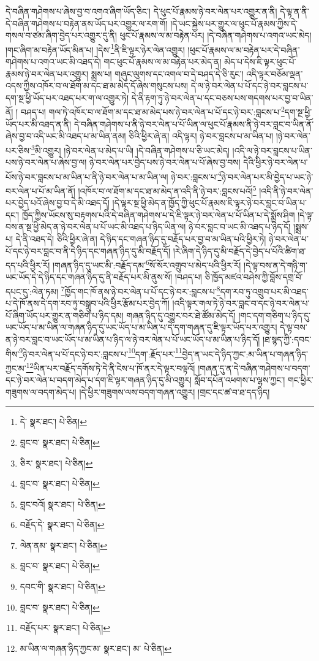 དེ་བཞིན་གཤེགས་པ་ཞེས་བྱ་བ་འགའ་ཞིག་ཡོད་ཅིང་། དེ་ཕུང་པོ་རྣམས་ཉེ་བར་ལེན་པར་འགྱུར་ན་ནི། དེ་ལྟ་ན་ནི་དེ་བཞིན་གཤེགས་པ་བརྟེན་ནས་ཡོད་པར་འགྱུར་ལ་རག་གོ། །དེ་ཡང་སྐྱེས་པར་གྱུར་ལ་ཕུང་པོ་རྣམས་ཀྱིས་དེ་གསལ་བ་ཙམ་ཞིག་བྱེད་པར་འགྱུར་དུ་ནི། ཕུང་པོ་རྣམས་ལ་མ་བརྟེན་པར། །དེ་བཞིན་གཤེགས་པ་འགའ་ཡང་མེད། །གང་ཞིག་མ་བརྟེན་ཡོད་མིན་པ། །དེས་\footnote{དེ་  སྣར་ཐང་།  པེ་ཅིན། }ནི་ཇི་ལྟར་ཉེར་ལེན་འགྱུར། །ཕུང་པོ་རྣམས་ལ་མ་བརྟེན་པར་དེ་བཞིན་གཤེགས་པ་འགའ་ཡང་མི་འཐད་དེ། གང་ཕུང་པོ་རྣམས་ལ་མ་བརྟེན་པར་མེད་ན། མེད་པ་དེས་ཇི་ལྟར་ཕུང་པོ་རྣམས་ཉེ་བར་ལེན་པར་འགྱུར། སྨྲས་པ། གཞུང་ལུགས་དང་འགལ་བ་དེ་བཤད་དེ་ཅི་རུང་། འདི་ལྟར་བཅོམ་ལྡན་འདས་ཀྱིས་འཁོར་བ་ལ་ཐོག་མ་དང་ཐ་མ་མེད་དོ་ཞེས་གསུངས་པས། དེ་ལ་ཉེ་བར་ལེན་པ་པོ་དང་ཉེ་བར་བླངས་པ་དག་སྔ་ཕྱི་ཡོད་པར་འཐད་པར་ག་ལ་འགྱུར་ཏེ། དེ་ནི་རྟག་ཏུ་ཉེ་བར་ལེན་པ་དང་བཅས་པས་གདགས་པར་བྱ་བ་ཡིན་ནོ། །
བཤད་པ། གལ་ཏེ་འཁོར་བ་ལ་ཐོག་མ་དང་ཐ་མ་མེད་པས་ཉེ་བར་ལེན་པ་པོ་དང་ཉེ་བར་:བླངས་པ་\footnote{བླང་བ་  སྣར་ཐང་།  པེ་ཅིན། }དག་སྔ་ཕྱི་ཡོད་པར་མི་འཐད་ན་ནི། དེ་བཞིན་གཤེགས་པ་ནི་ཉེ་བར་ལེན་པ་པོ་ཡིན་ལ་ཕུང་པོ་རྣམས་ནི་ཉེ་བར་བླང་བ་ཡིན་ནོ་ཞེས་བྱ་བ་འདི་ཡང་མི་འཐད་པ་མ་ཡིན་ནམ། ཅིའི་ཕྱིར་ཞེ་ན། འདི་ལྟར། ཉེ་བར་བླངས་པ་མ་ཡིན་པ། །ཉེ་བར་ལེན་པར་ཅིས་\footnote{ཅིར་  སྣར་ཐང་།  པེ་ཅིན། }མི་འགྱུར། །ཉེ་བར་ལེན་པ་མེད་པ་ཡི། །དེ་བཞིན་གཤེགས་པ་ཅི་ཡང་མེད། །འདི་ལ་ཉེ་བར་བླངས་པ་ཡིན་པས་ཉེ་བར་ལེན་པ་ཞེས་བྱ་ལ། ཉེ་བར་ལེན་པར་བྱེད་པས་ཉེ་བར་ལེན་པ་པོ་ཞེས་བྱ་བས། དེའི་ཕྱིར་ཉེ་བར་ལེན་པ་པོས་ཉེ་བར་བླངས་པ་མ་ཡིན་པ་ནི་ཉེ་བར་ལེན་པ་མ་ཡིན་ལ། ཉེ་བར་:བླངས་པ་\footnote{བླང་བ་  སྣར་ཐང་།  པེ་ཅིན། }ཉེ་བར་ལེན་པར་མི་བྱེད་པ་ཡང་ཉེ་བར་ལེན་པ་པོ་མ་ཡིན་ནོ། །འཁོར་བ་ལ་ཐོག་མ་དང་ཐ་མ་མེད་ན་འདི་ནི་ཉེ་བར་:བླངས་པའོ།\footnote{བླང་བའོ།  སྣར་ཐང་།  པེ་ཅིན། } །འདི་ནི་ཉེ་བར་ལེན་པར་བྱེད་པའོ་ཞེས་བྱ་བ་དེ་མི་འཐད་དོ། །དེ་ལྟར་སྔ་ཕྱི་མེད་ན་ཁྱོད་ཀྱི་ཕུང་པོ་རྣམས་ཇི་ལྟར་ཉེ་བར་བླང་བ་ཡིན་པ་དང་། ཁྱོད་ཀྱིས་ཡོངས་སུ་བརྟགས་པའི་དེ་བཞིན་གཤེགས་པ་དེ་ཇི་ལྟར་ཉེ་བར་ལེན་པ་པོ་ཡིན་པ་དེ་སྨྲོས་ཤིག །དེ་ལྟ་བས་ན་སྔ་ཕྱི་མེད་ན་ཉེ་བར་ལེན་པ་པོ་ཡང་མི་འཐད་པ་ཉིད་ཡིན་ལ། ཉེ་བར་བླང་བ་ཡང་མི་འཐད་པ་ཉིད་དོ། །སྨྲས་པ། དེ་ནི་འཐད་དེ། ཅིའི་ཕྱིར་ཞེ་ན། དེ་ཉིད་དང་གཞན་ཉིད་དུ་བརྗོད་པར་བྱ་བ་མ་ཡིན་པའི་ཕྱིར་ཏེ། ཉེ་བར་ལེན་པ་པོ་དང་ཉེ་བར་བླང་བ་ནི་དེ་ཉིད་དང་གཞན་ཉིད་དུ་མི་བརྗོད་དོ། །རེ་ཞིག་དེ་ཉིད་དུ་མི་བརྗོད་དེ་བྱེད་པ་པོའི་ཚིག་ཐ་དད་པའི་ཕྱིར་རོ། །གཞན་ཉིད་དུ་ཡང་མི་:བརྗོད་དམ་\footnote{བརྗོད་དེ་  སྣར་ཐང་།  པེ་ཅིན། }སོ་སོར་འགྲུབ་པ་མེད་པའི་ཕྱིར་རོ། །དེ་ལྟ་བས་ན་དེ་གཉི་ག་ཡང་ཡོད་དེ་དེ་ཉིད་དང་གཞན་ཉིད་དུ་ནི་བརྗོད་པར་མི་ནུས་སོ། །བཤད་པ། ཅི་ཁྱོད་མཛའ་བཤེས་ཀྱི་བློས་དགྲ་བོ་དཔང་དུ་:ལེན་ཏམ། \footnote{ལེན་ནམ་  སྣར་ཐང་།  པེ་ཅིན། }ཁྱོད་གང་ཁོ་ནས་ཉེ་བར་ལེན་པ་པོ་དང་ཉེ་བར་:བླངས་པ་\footnote{བླང་བ་  སྣར་ཐང་།  པེ་ཅིན། }དག་རབ་ཏུ་འགྲུབ་པར་མི་འཐད་པ་དེ་ཁོ་ནས་དེ་དག་རབ་ཏུ་བསྒྲུབ་པའི་ཕྱིར་རྩོམ་པར་བྱེད་ཀོ། །འདི་ལྟར་གལ་ཏེ་ཉེ་བར་བླང་བ་དང་ཉེ་བར་ལེན་པ་པོ་ཞིག་ཡོད་པར་གྱུར་ན་གཅིག་པ་ཉིད་དམ། གཞན་ཉིད་དུ་འགྱུར་བར་ཐེ་ཚོམ་མེད་དོ། །གང་དག་གཅིག་པ་ཉིད་དུ་ཡང་ཡོད་པ་མ་ཡིན་ལ་གཞན་ཉིད་དུ་ཡང་ཡོད་པ་མ་ཡིན་པ་དེ་དག་གཞན་དུ་ཇི་ལྟར་ཡོད་པར་འགྱུར། དེ་ལྟ་བས་ན་ཉེ་བར་བླང་བ་ཡང་ཡོད་པ་མ་ཡིན་པ་ཉིད་ལ་ཉེ་བར་ལེན་པ་པོ་ཡང་ཡོད་པ་མ་ཡིན་པ་ཉིད་དོ། །ཐ་སྙད་ཀྱི་:དབང་གིས་\footnote{དབང་གི་  སྣར་ཐང་།  པེ་ཅིན། }ཉེ་བར་ལེན་པ་པོ་དང་ཉེ་བར་:བླངས་པ་\footnote{བླང་བ་  སྣར་ཐང་།  པེ་ཅིན། }དག་:རྗོད་པར་\footnote{བརྗོད་པར་  སྣར་ཐང་།  པེ་ཅིན། }བྱེད་ན་ཡང་དེ་ཉིད་ཀྱང་:མ་ཡིན་པ་གཞན་ཉིད་ཀྱང་མ་\footnote{མ་ཡིན་ལ་གཞན་ཉིད་ཀྱང་མ་  སྣར་ཐང་། མ་  པེ་ཅིན། }ཡིན་པར་བརྗོད་དགོས་ཏེ་དེ་ནི་ངེས་པ་ཁོ་ནར་དེ་ལྟར་བལྟའོ། །གཞན་དུ་ན་དེ་བཞིན་གཤེགས་པ་བདག་དང་ཉེ་བར་ལེན་པ་བདག་མེད་པ་དག་ཇི་ལྟར་གཞན་ཉིད་དུ་མི་འགྱུར། སློབ་དཔོན་འཕགས་པ་ལྷས་ཀྱང་། གང་ཕྱིར་གཟུགས་ལ་བདག་མེད་པ། །དེ་ཕྱིར་གཟུགས་ལས་བདག་གཞན་འགྱུར། །གྲང་དང་ཚ་བ་ཐ་དད་ཉིད། 